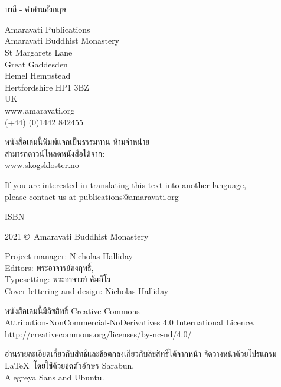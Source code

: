 
\thispagestyle{empty}

\resumeNormalText

\enlargethispage{\baselineskip}

{\centering
\ifaivedition
\fontsize{12}{15}\selectfont
\else
\small
\fi
\setlength{\parskip}{15pt}

{\normalsize
\thetitle\\
\thesubtitle\\
บาลี - คำอ่านอังกฤษ}

Amaravati Publications\\
Amaravati Buddhist Monastery\\
St Margarets Lane\\
Great Gaddesden\\
Hemel Hempstead\\
Hertfordshire HP1 3BZ\\
UK\\
www.amaravati.org\\
(+44) (0)1442 842455

หนังสือเล่มนี้พิมพ์แจกเป็นธรรมทาน ห้ามจำหน่าย\\
สามารถดาวน์โหลดหนังสือได้จาก:\\
www.skogskloster.no

If you are interested in translating this text into another language,\\
please contact us at publications@amaravati.org

ISBN \theISBN

2021 \copyright\ Amaravati Buddhist Monastery

Project manager: Nicholas Halliday\\
Editors: พระอาจารย์คงฤทธิ์,\\
Typesetting: พระอาจารย์ คัมภีโร\\
Cover lettering and design: Nicholas Halliday

\vfill

หนังสือเล่มนี้มีลิขสิทธิ์ Creative Commons\\
Attribution-NonCommercial-NoDerivatives 4.0 International Licence.\\
\href{http://creativecommons.org/licenses/by-nc-nd/4.0/}{http://creativecommons.org/licenses/by-nc-nd/4.0/}

อ่านรายละเอียดเกี่ยวกับสิทธิ์และข้อตกลงเกียวกับลิขสิทธิ์ได้จากหน้า \pageref{copyright-details}
จัดวางหน้าด้วยโปรแกรม \LaTeX\ โดยใช้ด้วยชุดตัวอักษร Sarabun,\\
Alegreya Sans and Ubuntu.

\theEditionInfo


}

